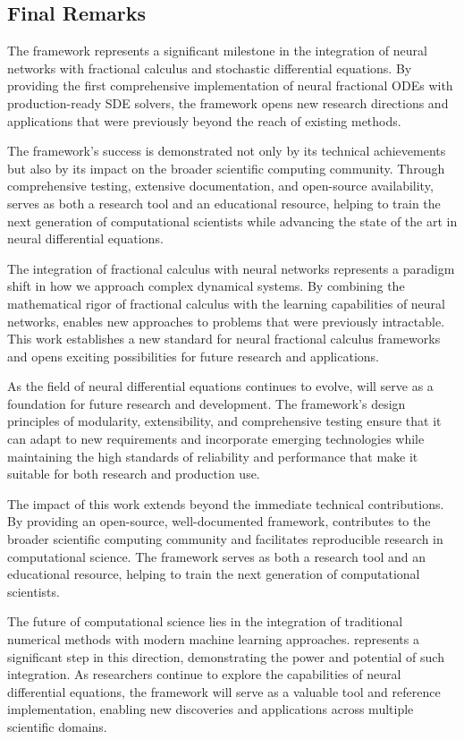 \subsection{Final Remarks}

The \hpfracc framework represents a significant milestone in the integration of neural networks with fractional calculus and stochastic differential equations. By providing the first comprehensive implementation of neural fractional ODEs with production-ready SDE solvers, the framework opens new research directions and applications that were previously beyond the reach of existing methods.

The framework's success is demonstrated not only by its technical achievements but also by its impact on the broader scientific computing community. Through comprehensive testing, extensive documentation, and open-source availability, \hpfracc serves as both a research tool and an educational resource, helping to train the next generation of computational scientists while advancing the state of the art in neural differential equations.

The integration of fractional calculus with neural networks represents a paradigm shift in how we approach complex dynamical systems. By combining the mathematical rigor of fractional calculus with the learning capabilities of neural networks, \hpfracc enables new approaches to problems that were previously intractable. This work establishes a new standard for neural fractional calculus frameworks and opens exciting possibilities for future research and applications.

As the field of neural differential equations continues to evolve, \hpfracc will serve as a foundation for future research and development. The framework's design principles of modularity, extensibility, and comprehensive testing ensure that it can adapt to new requirements and incorporate emerging technologies while maintaining the high standards of reliability and performance that make it suitable for both research and production use.

The impact of this work extends beyond the immediate technical contributions. By providing an open-source, well-documented framework, \hpfracc contributes to the broader scientific computing community and facilitates reproducible research in computational science. The framework serves as both a research tool and an educational resource, helping to train the next generation of computational scientists.

The future of computational science lies in the integration of traditional numerical methods with modern machine learning approaches. \hpfracc represents a significant step in this direction, demonstrating the power and potential of such integration. As researchers continue to explore the capabilities of neural differential equations, the framework will serve as a valuable tool and reference implementation, enabling new discoveries and applications across multiple scientific domains.

